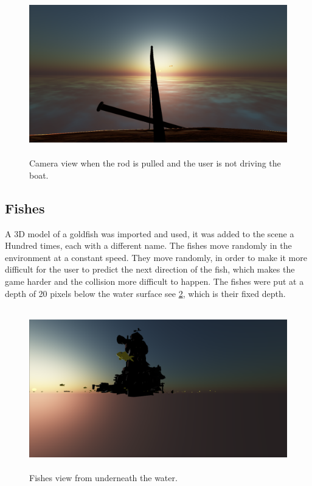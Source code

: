 \documentclass[paper=a4, fontsize=11pt]{scrartcl} %
\numberwithin{equation}{section} %
\numberwithin{figure}{section} %
\numberwithin{table}{section} %
\begin{document}
\begin{figure}[!ht]
\centering
\includegraphics[width=15cm, height=7cm]{images/pulledrod.png}
\caption{Camera view when the rod is pulled and the user is not driving the boat.}
\label{Urod}
\end{figure}

\newpage
\subsection{Fishes}

A 3D model of a goldfish was imported and used, it was added to the scene a Hundred times, each with a different name. The fishes move randomly in the environment at a constant speed. They move randomly, in order to make it more difficult for the user to predict the next direction of the fish, which makes the game harder and the collision more difficult to happen. The fishes were put at a depth of 20 pixels below the water surface see \ref{fishes}, which is their fixed depth. 

\begin{figure}[!ht]
\centering
\includegraphics[width=15cm, height=7cm]{images/fishes.png}
\caption{Fishes view from underneath the water.}
\label{fishes}
\end{figure}
\end{document}
